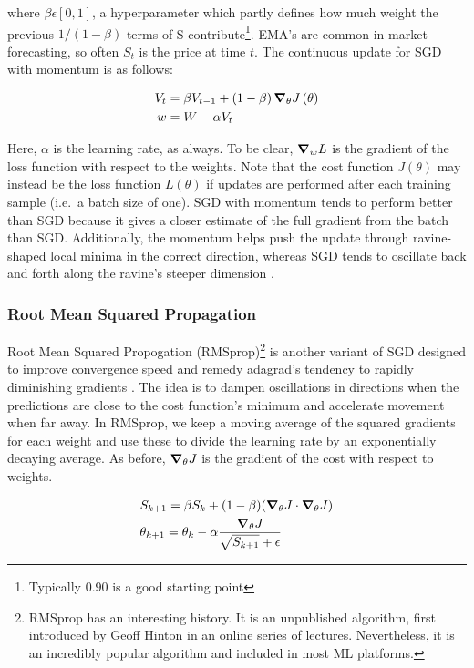 \noindent where $ \beta \epsilon [0,1]$, a hyperparameter which partly defines how much weight the previous $ 1/(1-\beta) $ terms of S contribute\footnote{Typically 0.90 is a good starting point}. EMA's are common in market forecasting, so often $ S_t $  is the price at time $ t $. The continuous update for SGD with momentum is as follows:

\begin{align}
    V_t &= \beta V_{t-1}  + \left( 1 - \beta \right) \grad_\theta J \left( \theta \right)\\
    w &= W - \alpha V_t
\end{align}


Here, $ \alpha $  is the learning rate, as always. To be clear, $\grad_w L$ is the gradient of the loss function with respect to the weights. Note that the cost function $ J(\theta) $ may instead be the loss function $ L(\theta) $ if updates are performed after each training sample (i.e.~a batch size of one). SGD with momentum tends to perform better than SGD because it gives a closer estimate of the full gradient from the batch than SGD. Additionally, the momentum helps push the update through ravine-shaped local minima in the correct direction, whereas SGD tends to oscillate back and forth along the ravine's steeper dimension \cite{qian1999momentum}.

\subsubsection{Root Mean Squared Propagation}
Root Mean Squared Propogation (RMSprop)\footnote{RMSprop has an interesting history. It is an unpublished algorithm, first introduced by Geoff Hinton in an online series of lectures. Nevertheless, it is an incredibly popular algorithm and included in most ML platforms.} is another variant of SGD designed to improve convergence speed and remedy adagrad's \cite{adagrad} tendency to rapidly diminishing gradients \cite{improving-rprop}\cite{2017marginal-adagrad}. The idea is to dampen oscillations in directions when the predictions are close to the cost function's minimum and accelerate movement when far away. In RMSprop, we keep a moving average of the squared gradients for each weight and use these to divide the learning rate by an exponentially decaying average. As before, $\grad_\theta J$ is the gradient of the cost with respect to weights.

\begin{align}
    \label{eqn:RMS_Prop}
    & S_{k+1} = \beta S_k + (1 - \beta)(\grad_\theta J \cdot \grad_\theta J) \\
    & \theta_{k+1} = \theta_k - \alpha \frac{\grad_\theta J}{\sqrt{S_{k+1}} + \epsilon}
\end{align}

